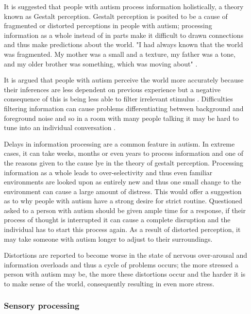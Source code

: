 \documentclass[11pt]{report}
\begin{document}
It is suggested that people with autism process information holistically, a theory known as Gestalt perception. Gestalt perception is posited to be a cause of fragmented or distorted perceptions in people with autism\cite{olgab}; processing information as a whole instead of in parts make it difficult to drawn connections and thus make predictions about the world.  "I had always known that the world was fragmented. My mother was a small and a texture, my father was a tone, and my older brother was something, which was moving about" \cite{williams1992}. 

It is argued that people with autism perceive the world more accurately because their inferences are less dependent on previous experience but a negative consequence of this is being less able to filter irrelevant stimulus \cite{bayes}. Difficulties filtering information can cause problems differentiating between background and foreground noise and so in a room with many people talking it may be hard to tune into an individual conversation \cite{bayes}. 

Delays in information processing are a common feature in autism. In extreme cases, it can take weeks, months or even years to process information and one of the reasons given to the cause lye in the theory of gestalt perception. Processing information as a whole leads to over-selectivity and thus even familiar environments are looked upon as entirely new and thus one small change to the environment can cause a large amount of distress\cite{olgab}. This would offer a suggestion as to why people with autism have a strong desire for strict routine. Questioned asked to a person with autism should be given ample time for a response, if their process of thought is interrupted it can cause a complete disruption and the individual has to start this process again\cite{olgab}. As a result of distorted perception, it may take someone with autism longer to adjust to their surroundings. 

Distortions are reported to become worse in the state of nervous over-arousal and information overloads\cite{olgab} and thus a cycle of problems occurs; the more stressed a person with autism may be, the more these distortions occur and the harder it is to make sense of the world, consequently resulting in even more stress.

\subsubsection{Sensory processing}
\end{document}
